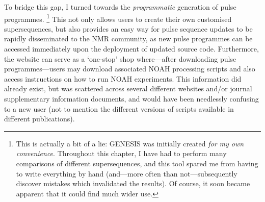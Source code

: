 To bridge this gap, I turned towards the \textit{programmatic} generation of pulse programmes.%
\footnote{This is actually a bit of a lie: GENESIS was initially created \textit{for my own convenience}. Throughout this chapter, I have had to perform many comparisons of different supersequences, and this tool spared me from having to write everything by hand (and---more often than not---subsequently discover mistakes which invalidated the results). Of course, it soon became apparent that it could find much wider use.}
This not only allows users to create their own customised supersequences, but also provides an easy way for pulse sequence updates to be rapidly disseminated to the NMR community, as new pulse programmes can be accessed immediately upon the deployment of updated source code.
Furthermore, the website can serve as a `one-stop' shop where---after downloading pulse programmes---users may download associated NOAH processing scripts and also access instructions on how to run NOAH experiments.
This information did already exist, but was scattered across several different websites and/or journal supplementary information documents, and would have been needlessly confusing to a new user (not to mention the different versions of scripts available in different publications).
